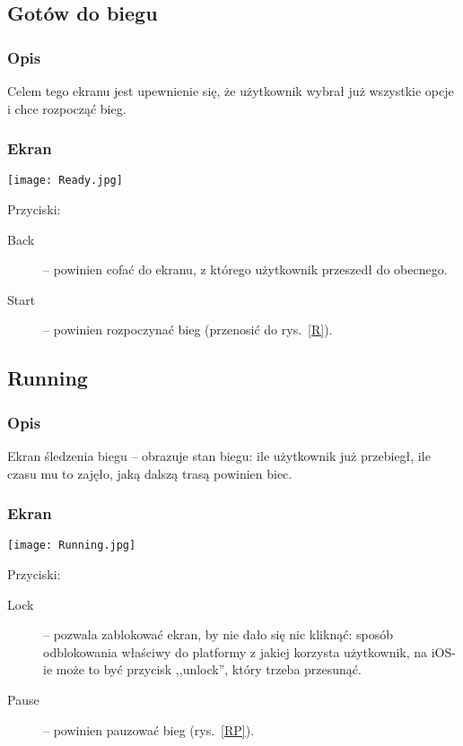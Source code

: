 \subsection{Gotów do biegu}
\subsubsection{Opis}
\noindent Celem tego ekranu jest upewnienie się, że użytkownik wybrał już wszystkie opcje i chce rozpocząć bieg. 
\subsubsection{Ekran}
\begin{minipage}{0.5\textwidth}
  \texttt{[image: Ready.jpg]}
  \label{RR}
\end{minipage}
\begin{minipage}{0.5\textwidth}
Przyciski:\\
\begin{description}
  \item[Back] -- powinien cofać do ekranu, z którego użytkownik przeszedł do obecnego.
  \item[Start] -- powinien rozpoczynać bieg (przenosić do rys.~\ref{R}).
\end{description}
\end{minipage}
\subsection{Running}
\subsubsection{Opis}
\noindent Ekran śledzenia biegu -- obrazuje stan biegu: ile użytkownik już przebiegł, ile czasu mu to zajęło, jaką dalszą trasą powinien biec.
\subsubsection{Ekran}
\begin{minipage}{0.5\textwidth}
  \texttt{[image: Running.jpg]}
  \label{R}
\end{minipage}
\begin{minipage}{0.5\textwidth}
Przyciski:\\
\begin{description}
  \item[Lock] -- pozwala zablokować ekran, by nie dało się nic kliknąć: sposób odblokowania właściwy do platformy z jakiej korzysta użytkownik, na iOS-ie może to być przycisk ,,unlock'', który trzeba przesunąć.
  \item[Pause] -- powinien pauzować bieg (rys.~\ref{RP}).
\end{description}
\end{minipage}
